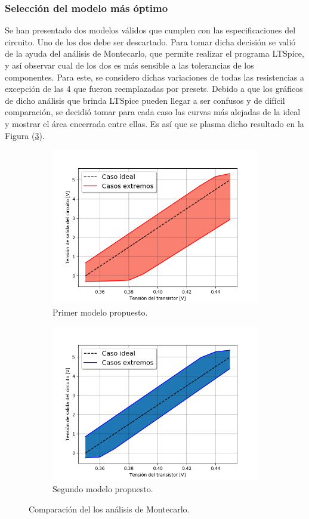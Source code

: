 \documentclass[a4paper]{article}
\begin{document}
\subsubsection{Selección del modelo más óptimo}

Se han presentado dos modelos válidos que cumplen con las especificaciones del circuito. Uno de los dos debe ser descartado. Para tomar dicha decisión se valió de la ayuda del análisis de Montecarlo, que permite realizar el programa LTSpice, y así observar cual de los dos es más sensible a las tolerancias de los componentes. Para este, se considero dichas variaciones de todas las resistencias a excepción de las 4 que fueron reemplazadas por presets. Debido a que los gráficos de dicho análisis que brinda LTSpice pueden llegar a ser confusos y de difícil comparación, se decidió tomar para cada caso las curvas más alejadas de la ideal y mostrar el área encerrada entre ellas. Es así que se plasma dicho resultado en la Figura (\ref{fig:mccomp}). 

\begin{figure}[H]
\centering
\begin{subfigure}{.8\textwidth}
  \centering
  \includegraphics[width=.85\linewidth]{Ejercicio6/Imagenes/MC-1M.png}
  \caption{Primer modelo propuesto.}
  \label{fig:mcm1}
\end{subfigure}
\begin{subfigure}{\textwidth}
  \centering
  \includegraphics[width=.7\linewidth]{Ejercicio6/Imagenes/MC-2M.png}
  \caption{Segundo modelo propuesto.}
  \label{fig:mcm2}
\end{subfigure}
\caption{Comparación del los análisis de Montecarlo.}
\label{fig:mccomp}
\end{figure}
\end{document}
